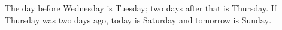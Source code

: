 The day before Wednesday is Tuesday; two days after that is Thursday. If Thursday was two days ago, today is Saturday and tomorrow is $\boxed{\text{Sunday}}$.
